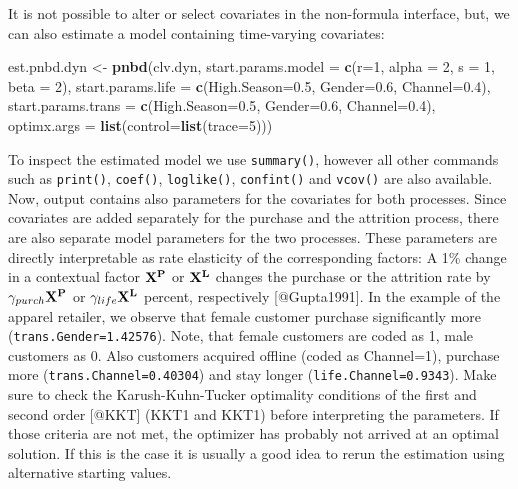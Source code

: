 \documentclass[
]{article}
\newenvironment{Shaded}{\begin{snugshade}}{\end{snugshade}}
\newcommand{\AttributeTok}[1]{\textcolor[rgb]{0.13,0.29,0.53}{#1}}
\newcommand{\DecValTok}[1]{\textcolor[rgb]{0.00,0.00,0.81}{#1}}
\newcommand{\FloatTok}[1]{\textcolor[rgb]{0.00,0.00,0.81}{#1}}
\newcommand{\FunctionTok}[1]{\textcolor[rgb]{0.13,0.29,0.53}{\textbf{#1}}}
\newcommand{\NormalTok}[1]{#1}
\newcommand{\OtherTok}[1]{\textcolor[rgb]{0.56,0.35,0.01}{#1}}
\begin{document}
It is not possible to alter or select covariates in the non-formula
interface, but, we can also estimate a model containing time-varying
covariates:

\begin{Shaded}
\begin{Highlighting}[]
\NormalTok{est.pnbd.dyn }\OtherTok{\textless{}{-}} \FunctionTok{pnbd}\NormalTok{(clv.dyn, }
                     \AttributeTok{start.params.model =} \FunctionTok{c}\NormalTok{(}\AttributeTok{r=}\DecValTok{1}\NormalTok{, }\AttributeTok{alpha =} \DecValTok{2}\NormalTok{, }\AttributeTok{s =} \DecValTok{1}\NormalTok{, }\AttributeTok{beta =} \DecValTok{2}\NormalTok{),}
                     \AttributeTok{start.params.life =} \FunctionTok{c}\NormalTok{(}\AttributeTok{High.Season=}\FloatTok{0.5}\NormalTok{, }\AttributeTok{Gender=}\FloatTok{0.6}\NormalTok{, }\AttributeTok{Channel=}\FloatTok{0.4}\NormalTok{),}
                     \AttributeTok{start.params.trans =} \FunctionTok{c}\NormalTok{(}\AttributeTok{High.Season=}\FloatTok{0.5}\NormalTok{, }\AttributeTok{Gender=}\FloatTok{0.6}\NormalTok{, }\AttributeTok{Channel=}\FloatTok{0.4}\NormalTok{),}
                     \AttributeTok{optimx.args =} \FunctionTok{list}\NormalTok{(}\AttributeTok{control=}\FunctionTok{list}\NormalTok{(}\AttributeTok{trace=}\DecValTok{5}\NormalTok{)))}
\end{Highlighting}
\end{Shaded}

To inspect the estimated model we use \texttt{summary()}, however all
other commands such as \texttt{print()}, \texttt{coef()},
\texttt{loglike()}, \texttt{confint()} and \texttt{vcov()} are also
available. Now, output contains also parameters for the covariates for
both processes. Since covariates are added separately for the purchase
and the attrition process, there are also separate model parameters for
the two processes. These parameters are directly interpretable as rate
elasticity of the corresponding factors: A 1\% change in a contextual
factor \(\bf{X}^{P}\) or \(\bf{X}^{L}\) changes the purchase or the
attrition rate by \(\gamma_{purch}\bf{X}^{P}\) or
\(\gamma_{life}\bf{X}^{L}\) percent, respectively {[}@Gupta1991{]}. In
the example of the apparel retailer, we observe that female customer
purchase significantly more (\texttt{trans.Gender=1.42576}). Note, that
female customers are coded as 1, male customers as 0. Also customers
acquired offline (coded as Channel=1), purchase more
(\texttt{trans.Channel=0.40304}) and stay longer
(\texttt{life.Channel=0.9343}). Make sure to check the
Karush-Kuhn-Tucker optimality conditions of the first and second order
{[}@KKT{]} (KKT1 and KKT1) before interpreting the parameters. If those
criteria are not met, the optimizer has probably not arrived at an
optimal solution. If this is the case it is usually a good idea to rerun
the estimation using alternative starting values.
\end{document}
